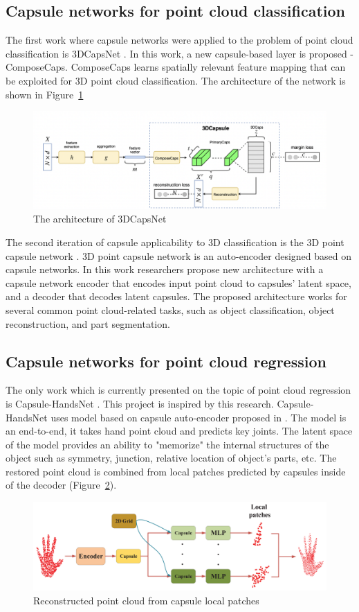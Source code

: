 \subsection{Capsule networks for point cloud classification}
The first work where capsule networks were applied to the problem of point cloud classification is 3DCapsNet \parencite{cheraghian_3dcapsule_2018}. In this work, a new capsule-based layer is proposed - ComposeCaps. ComposeCaps learns spatially relevant feature mapping that can be exploited for 3D point cloud classification. The architecture of the network is shown in Figure~\ref{img:3DCapsNet}

\begin{figure}[htbp]
    \centerline{\includegraphics[scale=0.4]{Figures/3DCapsNet.png}}
    \caption{The architecture of 3DCapsNet \parencite{cheraghian_3dcapsule_2018}}
    \label{img:3DCapsNet}
\end{figure}

The second iteration of capsule applicability to 3D classification is the 3D point capsule network \parencite{zhao_3d_2019}. 3D point capsule network is an auto-encoder designed based on capsule networks. In this work researchers propose new architecture with a capsule network encoder that encodes input point cloud to capsules' latent space, and a decoder that decodes latent capsules. The proposed architecture works for several common point cloud-related tasks, such as object classification, object reconstruction, and part segmentation.

\subsection{Capsule networks for point cloud regression} 
The only work which is currently presented on the topic of point cloud regression is Capsule-HandsNet \parencite{wu_3d_2020}. This project is inspired by this research. Capsule-HandsNet uses model based on capsule auto-encoder proposed in \cite{zhao_3d_2019}. The model is an end-to-end, it takes hand point cloud and predicts key joints. The latent space of the model provides an ability to "memorize" the internal structures of the object such as symmetry, junction, relative location of object's parts, etc. The restored point cloud is combined from local patches predicted by capsules inside of the decoder (Figure~\ref{img:capshandnet}).   

\begin{figure}[htbp]
    \centerline{\includegraphics[scale=0.9]{Figures/caps-hand-net.png}}
    \caption{Reconstructed point cloud from capsule local patches \parencite{wu_3d_2020}}
    \label{img:capshandnet}
\end{figure}
